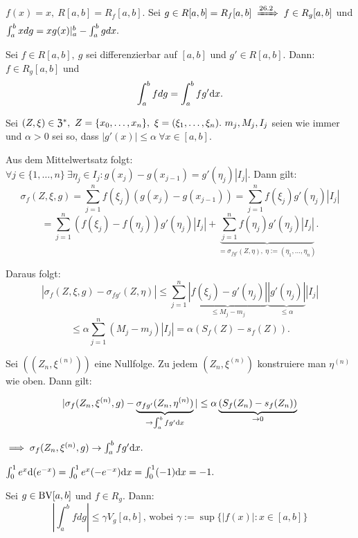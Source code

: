 \documentclass[a4paper,oneside,DIV15,BCOR12mm]{scrbook}
\begin{document}
\begin{beispiel}
$f(x) = x,\ R[a,b] = R_f[a,b].$ Sei $g \in R[a,b] = R_f[a,b] \folgtnach{26.2} f \in R_g[a,b]$ und $\intab* xdg = xg(x)|_a^b - \intab* gdx.$
\end{beispiel}

\begin{satz}
Sei $f \in R[a,b],\ g$ sei differenzierbar auf $[a,b]$ und $g' \in R[a,b].$ Dann: $f \in R_g[a,b]$ und $$\intab* fdg = \intab* fg'\dx.$$
\end{satz}

\begin{beweis}
Sei $(Z,\xi) \in \mathfrak{Z}^*,\ Z = \{x_0,\ldots,x_n\},\ \xi = (\xi_1,\ldots,\xi_n).\ m_j,M_j,I_j$ seien wie immer und $\alpha > 0$ sei so, dass $|g'(x)| \le \alpha\ \forall x \in [a,b].$

Aus dem Mittelwertsatz folgt: $\forall j \in \{1,\ldots,n\}\ \exists \eta_j \in I_j: g(x_j) - g(x_{j-1}) = g'(\eta_j) |I_j|.$ Dann gilt:
$$\sigma_f(Z,\xi,g) = \sum_{j=1}^nf(\xi_j)(g(x_j) - g(x_{j-1})) = \sum_{j=1}^n f(\xi_j)g'(\eta_j) |I_j|$$
$$= \sum_{j=1}^n (f(\xi_j) - f(\eta_j))g'(\eta_j) |I_j| + \underbrace{\sum_{j=1}^n f(\eta_j)g'(\eta_j) |I_j|}_{= \sigma_{fg'}(Z,\eta),\ \eta := (\eta_1,\ldots,\eta_n)}.$$

Daraus folgt:
$$|\sigma_f(Z,\xi,g) - \sigma_{fg'}(Z,\eta)| \le \sum_{j=1}^n \underbrace{|f(\xi_j) - g'(\eta_j)|}_{\le M_j - m_j} \underbrace{|g'(\eta_j)|}_{\le \alpha} |I_j|$$
$$\le \alpha \sum_{j=1}^n (M_j - m_j) |I_j| = \alpha (S_f(Z) - s_f(Z)).$$

Sei $((Z_n,\xi^{(n)}))$ eine Nullfolge. Zu jedem $(Z_n,\xi^{(n)})$ konstruiere man $\eta^{(n)}$ wie oben. Dann gilt:

$$|\sigma_f(Z_n,\xi^{(n)},g) - \underbrace{\sigma_{fg'}(Z_n,\eta^{(n)})}_{\to \intab* fg'\dx}| \le \alpha \underbrace{(S_f(Z_n) - s_f(Z_n))}_{\to 0}$$

$\folgt \sigma_f(Z_n,\xi^{(n)},g) \to \intab* fg'\dx.$
\end{beweis}

\begin{beispiel}
$\int_0^1 e^x \text{d}(e^{-x}) = \int_0^1 e^x(-e^{-x})\text{d}x = \int_0^1 (-1)\text{d}x = -1.$
\end{beispiel}

\begin{satz}
Sei $g \in \text{BV}[a,b]$ und $f \in R_{g}$. Dann: $${\left|\int_a^b fdg\right|}\le\gamma V_g[a,b]\text{, wobei }\gamma:=\sup\{|f(x)|: x \in [a,b]\}$$ $ $
\end{satz}
\end{document}
